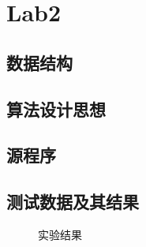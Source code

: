 \documentclass[a4paper,11pt,UTF8]{ctexart}
\begin{document}
\section{Lab2}
\subsection{数据结构}
\subsection{算法设计思想}
\subsection{源程序}

\subsection{测试数据及其结果}

\begin{figure}[htbp] %
    \centering
    \caption{实验结果}
\end{figure}
\end{document}
